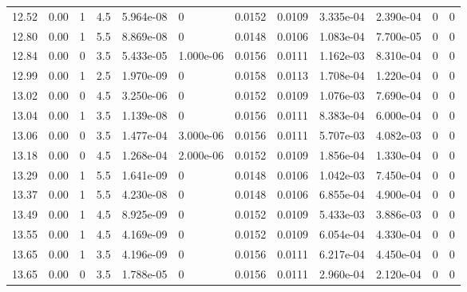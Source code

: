 \documentclass[preview]{standalone}
\begin{document}
{{{{\begin{tabular}{L{1.2cm}C{1.2cm} C{0.3cm}C{0.5cm} C{1.4cm}C{1.4cm} C{1.4cm}C{1.4cm} C{1.6cm}C{1.6cm} C{1.6cm}C{1.6cm}}
  12.52  &  0.00  & 1     & 4.5 &  5.964e-08  & 0  &  0.0152&   0.0109& 3.335e-04 & 2.390e-04   &  0 & 0  \\ 
  12.80  &  0.00  & 1     & 5.5 &  8.869e-08  & 0  &  0.0148&   0.0106& 1.083e-04 & 7.700e-05   &  0 & 0  \\ 
  12.84  &  0.00  & 0     & 3.5 &  5.433e-05  & 1.000e-06  &  0.0156&   0.0111& 1.162e-03 & 8.310e-04   &  0 & 0  \\ 
  12.99  &  0.00  & 1     & 2.5 &  1.970e-09  & 0  &  0.0158&   0.0113& 1.708e-04 & 1.220e-04   &  0 & 0  \\ 
  13.02  &  0.00  & 0     & 4.5 &  3.250e-06  & 0  &  0.0152&   0.0109& 1.076e-03 & 7.690e-04   &  0 & 0  \\ 
  13.04  &  0.00  & 1     & 3.5 &  1.139e-08  & 0  &  0.0156&   0.0111& 8.383e-04 & 6.000e-04   &  0 & 0  \\ 
  13.06  &  0.00  & 0     & 3.5 &  1.477e-04  & 3.000e-06  &  0.0156&   0.0111& 5.707e-03 & 4.082e-03   &  0 & 0  \\ 
  13.18  &  0.00  & 0     & 4.5 &  1.268e-04  & 2.000e-06  &  0.0152&   0.0109& 1.856e-04 & 1.330e-04   &  0 & 0  \\ 
  13.29  &  0.00  & 1     & 5.5 &  1.641e-09  & 0  &  0.0148&   0.0106& 1.042e-03 & 7.450e-04   &  0 & 0  \\ 
  13.37  &  0.00  & 1     & 5.5 &  4.230e-08  & 0  &  0.0148&   0.0106& 6.855e-04 & 4.900e-04   &  0 & 0  \\ 
  13.49  &  0.00  & 1     & 4.5 &  8.925e-09  & 0  &  0.0152&   0.0109& 5.433e-03 & 3.886e-03   &  0 & 0  \\ 
  13.55  &  0.00  & 1     & 4.5 &  4.169e-09  & 0  &  0.0152&   0.0109& 6.054e-04 & 4.330e-04   &  0 & 0  \\ 
  13.65  &  0.00  & 1     & 3.5 &  4.196e-09  & 0  &  0.0156&   0.0111& 6.217e-04 & 4.450e-04   &  0 & 0  \\ 
  13.65  &  0.00  & 0     & 3.5 &  1.788e-05  & 0  &  0.0156&   0.0111& 2.960e-04 & 2.120e-04   &  0 & 0  \\ 
\hline 
\end{tabular} 

}}}}
\end{document}
